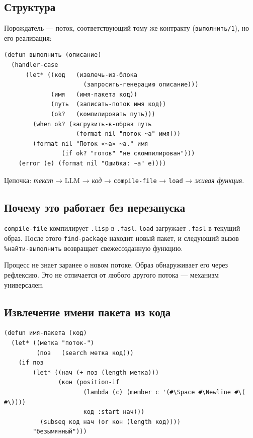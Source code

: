 \documentclass[11pt,a4paper]{article}
\begin{document}
\subsection{Структура}

Порождатель — поток, соответствующий тому же контракту (\texttt{выполнить/1}), но его реализация:

\begin{lstlisting}[caption={мастер/потоки/порождатель.lisp — суть}]
(defun выполнить (описание)
  (handler-case
      (let* ((код   (извлечь-из-блока
                      (запросить-генерацию описание)))
             (имя   (имя-пакета код))
             (путь  (записать-поток имя код))
             (ok?   (компилировать путь)))
        (when ok? (загрузить-в-образ путь
                    (format nil "поток-~a" имя)))
        (format nil "Поток «~a» ~a." имя
                (if ok? "готов" "не скомпилирован")))
    (error (e) (format nil "Ошибка: ~a" e))))
\end{lstlisting}

Цепочка: \textit{текст} → LLM → \textit{код} → \texttt{compile-file} → \texttt{load} → \textit{живая функция}.

\subsection{Почему это работает без перезапуска}

\texttt{compile-file} компилирует \texttt{.lisp} в \texttt{.fasl}. \texttt{load} загружает \texttt{.fasl} в текущий образ. После этого \texttt{find-package} находит новый пакет, и следующий вызов \texttt{\%найти-выполнить} возвращает свежесозданную функцию.

Процесс не знает заранее о новом потоке. Образ обнаруживает его через рефлексию. Это не отличается от любого другого потока — механизм универсален.

\subsection{Извлечение имени пакета из кода}

\begin{lstlisting}[caption={мастер/потоки/порождатель.lisp — имя без парсера}]
(defun имя-пакета (код)
  (let* ((метка "поток-")
         (поз   (search метка код)))
    (if поз
        (let* ((нач (+ поз (length метка)))
               (кон (position-if
                      (lambda (c) (member c '(#\Space #\Newline #\( #\))))
                      код :start нач)))
          (subseq код нач (or кон (length код))))
        "безымянный")))
\end{lstlisting}
\end{document}
